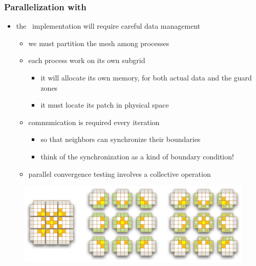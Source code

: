 %
%


\begin{frame}[fragile]
%
  \frametitle{Parallelization with \mpi}
%
  \begin{itemize}
%
  \item the \mpi\ implementation will require careful data management
    \begin{itemize}
    \item we must partition the mesh among processes
    \item each process work on its own subgrid
      \begin{itemize}
      \item it will allocate its own memory, for both actual data and the guard zones
      \item it must locate its patch in physical space
      \end{itemize}
    \item communication is required every iteration
      \begin{itemize}
      \item so that neighbors can synchronize their boundaries
      \item think of the synchronization as a kind of boundary condition!
      \end{itemize}
    \item parallel convergence testing involves a collective operation
    \end{itemize}
%
  \end{itemize}
%
  \begin{figure}
    \includegraphics[scale=0.5]{figures/structured-partitioning.pdf}
  \end{figure} 
% 
\end{frame}

